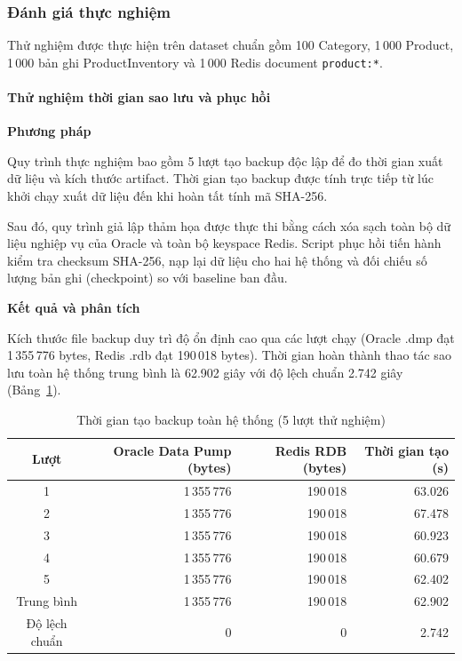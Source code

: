 \subsubsection{Đánh giá thực nghiệm}

Thử nghiệm được thực hiện trên dataset chuẩn gồm 100 Category, 1\,000 Product, 1\,000 bản ghi ProductInventory và 1\,000 Redis document \texttt{product:*}.

\paragraph{Thử nghiệm thời gian sao lưu và phục hồi}

\noindent\textbf{Phương pháp}\par
Quy trình thực nghiệm bao gồm 5 lượt tạo backup độc lập để đo thời gian xuất dữ liệu và kích thước artifact. Thời gian tạo backup được tính trực tiếp từ lúc khởi chạy xuất dữ liệu đến khi hoàn tất tính mã SHA-256.

Sau đó, quy trình giả lập thảm họa được thực thi bằng cách xóa sạch toàn bộ dữ liệu nghiệp vụ của Oracle và toàn bộ keyspace Redis. Script phục hồi tiến hành kiểm tra checksum SHA-256, nạp lại dữ liệu cho hai hệ thống và đối chiếu số lượng bản ghi (checkpoint) so với baseline ban đầu.

\noindent\textbf{Kết quả và phân tích}\par
Kích thước file backup duy trì độ ổn định cao qua các lượt chạy (Oracle .dmp đạt 1\,355\,776 bytes, Redis .rdb đạt 190\,018 bytes). Thời gian hoàn thành thao tác sao lưu toàn hệ thống trung bình là 62.902 giây với độ lệch chuẩn 2.742 giây (Bảng~\ref{tab:bk-backup-duration}).

\begin{table}[H]
    \centering
    \caption{Thời gian tạo backup toàn hệ thống (5 lượt thử nghiệm)}
    \label{tab:bk-backup-duration}
    \begin{tabular}{@{}crrr@{}}
        \toprule
        Lượt & Oracle Data Pump (bytes) & Redis RDB (bytes) & Thời gian tạo (s) \\
        \midrule
        1 & 1\,355\,776 & 190\,018 & 63.026 \\
        2 & 1\,355\,776 & 190\,018 & 67.478 \\
        3 & 1\,355\,776 & 190\,018 & 60.923 \\
        4 & 1\,355\,776 & 190\,018 & 60.679 \\
        5 & 1\,355\,776 & 190\,018 & 62.402 \\
        \midrule
        Trung bình & 1\,355\,776 & 190\,018 & 62.902 \\
        Độ lệch chuẩn & 0 & 0 & 2.742 \\
        \bottomrule
    \end{tabular}
\end{table}


